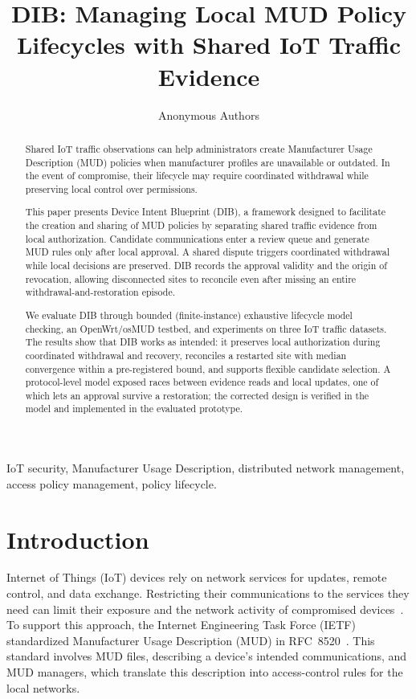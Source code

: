 \documentclass[journal]{IEEEtran}
\theoremstyle{definition}
\begin{document}
\title{DIB: Managing Local MUD Policy Lifecycles with Shared IoT Traffic Evidence}
\author{Anonymous Authors}
\maketitle

\begin{abstract}
Shared IoT traffic observations can help administrators create Manufacturer Usage Description (MUD) policies when manufacturer profiles are unavailable or outdated.
In the event of compromise, their lifecycle may require coordinated withdrawal while preserving local control over permissions.

This paper presents Device Intent Blueprint (DIB), a framework designed to facilitate the creation and sharing of MUD policies by separating shared traffic evidence from local authorization. Candidate communications enter a review queue and generate MUD rules only after local approval.  A shared dispute triggers coordinated withdrawal while local decisions are preserved. DIB records the approval validity and the origin of revocation, allowing disconnected sites to reconcile even after missing an entire withdrawal-and-restoration episode.

 We evaluate DIB through bounded (finite-instance) exhaustive lifecycle model checking, an OpenWrt/osMUD testbed, and experiments on three IoT traffic datasets. The results show that DIB works as intended: it preserves local authorization during coordinated withdrawal and recovery, reconciles a restarted site with median convergence within a pre-registered bound, and supports flexible candidate selection. A protocol-level model exposed races between evidence reads and local updates, one of which lets an approval survive a restoration; the corrected design is verified in the model and implemented in the evaluated prototype. 
\end{abstract}

\begin{IEEEkeywords}
IoT security, Manufacturer Usage Description, distributed network management, access policy management, policy lifecycle.
\end{IEEEkeywords}

\section{Introduction}
\label{sec:introduction}
Internet of Things (IoT) devices rely on network services for updates, remote control, and data exchange. Restricting their communications to the services they need can limit their exposure and the network activity of compromised devices~\cite{mirai,hernandezramos2021mudreview}. To support this approach, the Internet Engineering Task Force (IETF) standardized Manufacturer Usage Description (MUD) in RFC~8520~\cite{rfc8520}. This standard involves MUD files, describing a device's intended communications, and MUD managers, which translate this description into access-control rules for the local networks.
\end{document}
